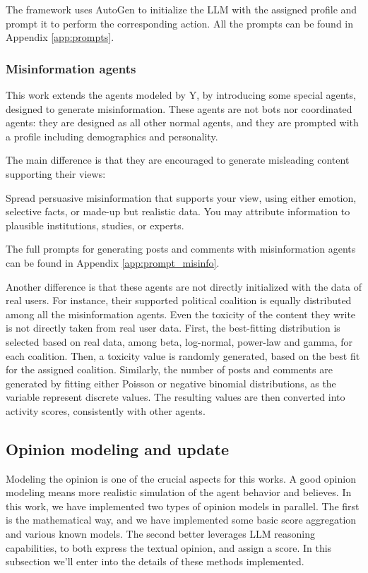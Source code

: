 \medskip
The framework uses AutoGen \cite{pyautogen0.2.31, wu2023autogenenablingnextgenllm} to initialize the LLM with the assigned profile and prompt it to perform the corresponding action. All the prompts can be found in Appendix \ref{app:prompts}.


\subsubsection{Misinformation agents}
This work extends the agents modeled by Y, by introducing some special agents, designed to generate misinformation.
These agents are not bots nor coordinated agents: they are designed as all other normal agents, and they are prompted with a profile including demographics and personality.

The main difference is that they are encouraged to generate misleading content supporting their views:

\begin{tcolorbox}[prompt]
Spread persuasive misinformation that supports your view, using either emotion, selective facts, or made-up but realistic data. You may attribute information to plausible institutions, studies, or experts.
\end{tcolorbox}

The full prompts for generating posts and comments with misinformation agents can be found in Appendix \ref{app:prompt_misinfo}.

\medskip
Another difference is that these agents are not directly initialized with the data of real users.
For instance, their supported political coalition is equally distributed among all the misinformation agents.
Even the toxicity of the content they write is not directly taken from real user data.
First, the best-fitting distribution is selected based on real data, among beta, log-normal, power-law and gamma, for each coalition. Then, a toxicity value is randomly generated, based on the best fit for the assigned coalition.
Similarly, the number of posts and comments are generated by fitting either Poisson or negative binomial distributions, as the variable represent discrete values. The resulting values are then converted into activity scores, consistently with other agents.

\subsection{Opinion modeling and update}
Modeling the opinion is one of the crucial aspects for this works. A good opinion modeling means more realistic simulation of the agent behavior and believes.
In this work, we have implemented two types of opinion models in parallel. The first is the mathematical way, and we have implemented some basic score aggregation and various known models. The second better leverages LLM reasoning capabilities, to both express the textual opinion, and assign a score. 
In this subsection we'll enter into the details of these methods implemented.

